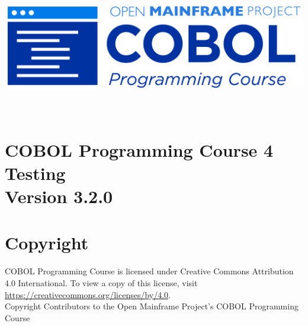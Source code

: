 \begin{center}
  \vspace*{25pt}
\includegraphics[width=\textwidth]{Images/COBOL-Programming-Course.png}
\hypertarget{cobol-programming-course-4}{%
\section*{
  \\[35pt]
  \Huge COBOL Programming Course 4 \\[10pt]
  \Huge Testing \\[15pt]
  \Large Version 3.2.0}\label{cobol-programming-course-3}}
\end{center}

\pagebreak
\hypertarget{copyright}{%
\section*{Copyright}{
  \normalsize COBOL Programming Course is licensed under Creative Commons 
  Attribution 4.0 International. To view a copy of this license, visit 
  \href{https://creativecommons.org/licenses/by/4.0}{https://creativecommons.org/licenses/by/4.0}. \\[10pt]
  Copyright Contributors to the Open Mainframe Project's COBOL Programming Course}\label{copyright}}
\pagebreak